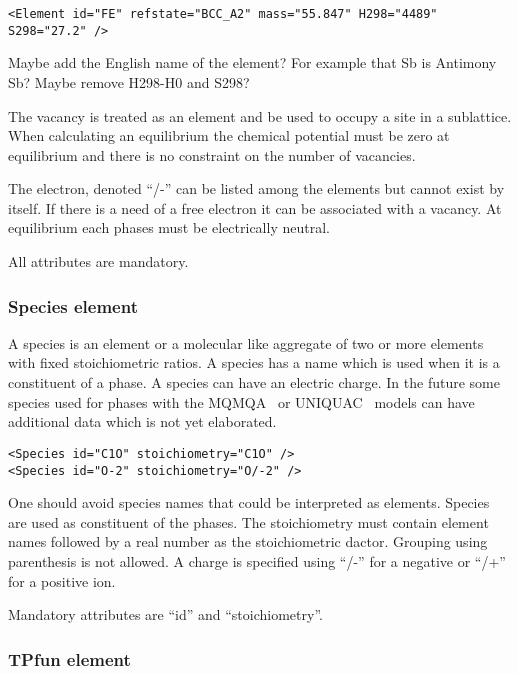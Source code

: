 \documentclass[12pt]{article}
\begin{document}
\begin{appendices}
{\small
\begin{verbatim}
<Element id="FE" refstate="BCC_A2" mass="55.847" H298="4489" S298="27.2" />
\end{verbatim}
}

Maybe add the English name of the element?  For example that Sb is
Antimony Sb?  Maybe remove H298-H0 and S298?

The vacancy is treated as an element and be used to occupy a site in a
sublattice.  When calculating an equilibrium the chemical potential
must be zero at equilibrium and there is no constraint on the number
of vacancies.

The electron, denoted ``/-'' can be listed among the elements but
cannot exist by itself.  If there is a need of a free electron it can
be associated with a vacancy.  At equilibrium each phases must be
electrically neutral.

All attributes are mandatory.

\subsubsection{Species element}\label{sc:spel}

A species is an element or a molecular like aggregate of two or more
elements with fixed stoichiometric ratios.  A species has a name which
is used when it is a constituent of a phase.  A species can have an
electric charge.  In the future some species used for phases with the
MQMQA~\cite{01Pel2} or UNIQUAC~\cite{20Li} models can have additional
data which is not yet elaborated.

\begin{verbatim}
<Species id="C1O" stoichiometry="C1O" />
<Species id="O-2" stoichiometry="O/-2" />
\end{verbatim}

One should avoid species names that could be interpreted as elements.
Species are used as constituent of the phases.  The stoichiometry must
contain element names followed by a real number as the stoichiometric
dactor.  Grouping using parenthesis is not allowed.  A charge is
specified using ``/-'' for a negative or ``/+'' for a positive ion.

Mandatory attributes are ``id'' and ``stoichiometry''.

\subsubsection{TPfun element}


\end{appendices}
\end{document}
